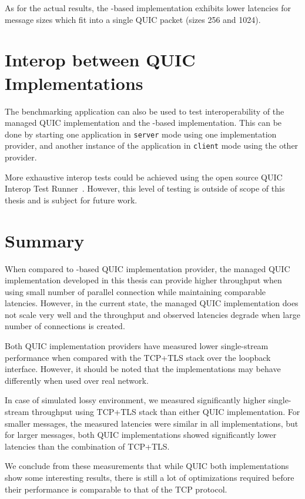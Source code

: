 As for the actual results, the \libmsquic{}-based
implementation exhibits lower latencies for message sizes which fit into a single QUIC packet (sizes
\SI{256}{\byte} and \SI{1024}{\byte}).

\section{Interop between QUIC Implementations}

The benchmarking application can also be used to test interoperability of the managed QUIC
implementation and the \libmsquic{}-based implementation. This can be done by starting one
application in \texttt{server} mode using one implementation provider, and another instance of the
application in \texttt{client} mode using the other provider.

More exhaustive interop tests could be achieved using the open source QUIC Interop Test
Runner~\cite{QuicInteropRunner}. However, this level of testing is outside of scope of this thesis
and is subject for future work.

\section{Summary}


When compared to \libmsquic{}-based QUIC implementation provider, the managed QUIC implementation
developed in this thesis can provide higher throughput when using small number of parallel
connection while maintaining comparable latencies. However, in the current state, the managed QUIC
implementation does not scale very well and the throughput and observed latencies degrade when large
number of connections is created.

Both QUIC implementation providers have measured lower single-stream performance when compared with
the TCP+TLS stack over the loopback interface. However, it should be noted that the implementations
may behave differently when used over real network.

In case of simulated lossy environment, we measured significantly higher single-stream throughput
using TCP+TLS stack than either QUIC implementation. For smaller messages, the measured latencies
were similar in all implementations, but for larger messages, both QUIC implementations showed
significantly lower latencies than the combination of TCP+TLS\@.

We conclude from these measurements that while QUIC both implementations show some interesting
results, there is still a lot of optimizations required before their performance is comparable to
that of the TCP protocol.


